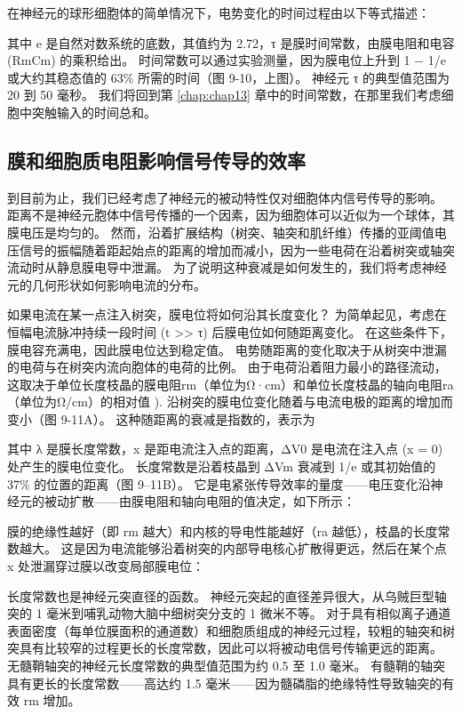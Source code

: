 在神经元的球形细胞体的简单情况下，电势变化的时间过程由以下等式描述：


其中 e 是自然对数系统的底数，其值约为 2.72，τ 是膜时间常数，由膜电阻和电容 (RmCm) 的乘积给出。
时间常数可以通过实验测量，因为膜电位上升到 1 − 1/e 或大约其稳态值的 63\% 所需的时间（图 9-10，上图）。 
神经元 τ 的典型值范围为 20 到 50 毫秒。 我们将回到第 \ref{chap:chap13} 章中的时间常数，在那里我们考虑细胞中突触输入的时间总和。



\subsection{膜和细胞质电阻影响信号传导的效率}
到目前为止，我们已经考虑了神经元的被动特性仅对细胞体内信号传导的影响。 
距离不是神经元胞体中信号传播的一个因素，因为细胞体可以近似为一个球体，其膜电压是均匀的。 
然而，沿着扩展结构（树突、轴突和肌纤维）传播的亚阈值电压信号的振幅随着距起始点的距离的增加而减小，因为一些电荷在沿着树突或轴突流动时从静息膜电导中泄漏。 
为了说明这种衰减是如何发生的，我们将考虑神经元的几何形状如何影响电流的分布。


如果电流在某一点注入树突，膜电位将如何沿其长度变化？ 
为简单起见，考虑在恒幅电流脉冲持续一段时间 (t >> τ) 后膜电位如何随距离变化。 
在这些条件下，膜电容充满电，因此膜电位达到稳定值。 电势随距离的变化取决于从树突中泄漏的电荷与在树突内流向胞体的电荷的比例。 
由于电荷沿着阻力最小的路径流动，这取决于单位长度枝晶的膜电阻rm（单位为Ω·cm）和单位长度枝晶的轴向电阻ra（单位为Ω/cm）的相对值 ). 
沿树突的膜电位变化随着与电流电极的距离的增加而变小（图 9-11A）。 
这种随距离的衰减是指数的，表示为


其中 λ 是膜长度常数，x 是距电流注入点的距离，ΔV0 是电流在注入点 (x = 0) 处产生的膜电位变化。 
长度常数是沿着枝晶到 ΔVm 衰减到 1/e 或其初始值的 37\% 的位置的距离（图 9–11B）。 
它是电紧张传导效率的量度——电压变化沿神经元的被动扩散——由膜电阻和轴向电阻的值决定，如下所示：


膜的绝缘性越好（即 rm 越大）和内核的导电性能越好（ra 越低），枝晶的长度常数越大。 
这是因为电流能够沿着树突的内部导电核心扩散得更远，然后在某个点 x 处泄漏穿过膜以改变局部膜电位：


长度常数也是神经元突直径的函数。 
神经元突起的直径差异很大，从乌贼巨型轴突的 1 毫米到哺乳动物大脑中细树突分支的 1 微米不等。 
对于具有相似离子通道表面密度（每单位膜面积的通道数）和细胞质组成的神经元过程，较粗的轴突和树突具有比较窄的过程更长的长度常数，因此可以将被动电信号传输更远的距离。 
无髓鞘轴突的神经元长度常数的典型值范围为约 0.5 至 1.0 毫米。 
有髓鞘的轴突具有更长的长度常数——高达约 1.5 毫米——因为髓磷脂的绝缘特性导致轴突的有效 rm 增加。


